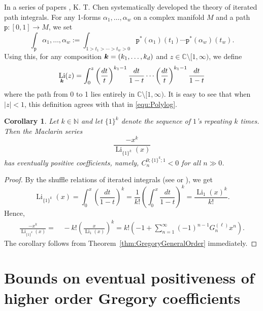 \documentclass[11pt]{article}
\newcommand\ga{{\alpha}}
\newcommand{\bfk}{{\boldsymbol{\sl{k}}}}
\DeclareMathOperator{\Li}{Li}
\def\N{\mathbb{N}}
\def\CC{\mathbb{C}}
\theoremstyle{plain}
\newtheorem{cor}[thm]{Corollary}
\theoremstyle{definition}
\begin{document}
In a series of papers \cite{KTChen1954,KTChen1971,KTChen1977}, K. T. Chen systematically developed the theory of iterated path integrals. For any 1-forms $\ga_1,\dots,\ga_w$ on a complex manifold $M$ and a path ${\texttt p}:[0,1]\to M$, we set
\begin{equation*}
\int_{\texttt p} \ga_1,\dots,\ga_w :=\int_{1>t_1>\cdots>t_w>0} {\texttt p}^*(\ga_1)(t_1)\cdots   {\texttt p}^*(\ga_w)(t_w).
\end{equation*}
Using this, for any composition $\bfk=(k_1,\dots,k_d)$ and $z\in\CC\setminus [1,\infty)$, we define
\begin{equation*}
    \Li_\bfk(z)=\int_0^z \left(\frac{dt}{t}\right)^{k_1-1}\frac{dt}{1-t}\cdots \left(\frac{dt}{t}\right)^{k_1-1}\frac{dt}{1-t}
\end{equation*}
where the path from 0 to 1 lies entirely in $\CC\setminus [1,\infty)$. It is easy to see that when $|z|<1$, this definition agrees with that in \eqref{equ:Polylog}.

\begin{cor}\label{cor:multilogGregory}
Let $k\in\N$ and let $\{1\}^k$ denote the sequence of $1$'s repeating $k$ times. Then the Maclarin series
\begin{equation*}
    \frac{-x^k}{\Li_{\{1\}^k}(x)}
\end{equation*}
has eventually positive coefficients, namely, $C_n^{0;\{1\}^k;1}<0$ for all $n\gg 0$.
\end{cor}
\begin{proof}
By the shuffle relations of iterated integrals (see \cite[(1.5.1)]{KTChen1971} or \cite{Ree1958}), we get
\begin{equation*}
\Li_{\{1\}^k}(x)=\int_0^x \left(\frac{dt}{1-t}\right)^k=\frac{1}{k!} \left(\int_0^x \frac{dt}{1-t}\right)^k=\frac{\Li_1(x)^k}{k!}.
\end{equation*}
Hence,
\begin{align*}
\frac{-x^k}{\Li_{\{1\}^k}(x)}=&\,-k!\left(\frac{x}{\Li_1(x)}\right)^k
=k! \left(-1 +\sum_{n=1}^\infty (-1)^{n-1} G_n^{(\ell)}x^n\right).
\end{align*}
The corollary follows from Theorem~\ref{thm:GregoryGeneralOrder} immediately.
\end{proof}


\section{Bounds on eventual positiveness of higher order Gregory coefficients}
\end{document}
